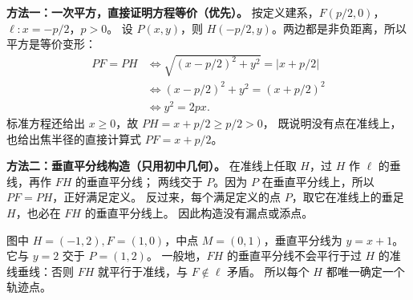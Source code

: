 \begin{proofbox}
\textbf{方法一：一次平方，直接证明方程等价（优先）。}
按定义建系，$F(p/2,0)$，$\ell:x=-p/2$，$p>0$。
设 $P(x,y)$，则 $H(-p/2,y)$。两边都是非负距离，所以平方是等价变形：
\[
\begin{aligned}
PF=PH
&\iff \sqrt{(x-p/2)^2+y^2}=|x+p/2|\\
&\iff (x-p/2)^2+y^2=(x+p/2)^2\\
&\iff \boxed{y^2=2px}.
\end{aligned}
\]
标准方程还给出 $x\ge0$，故 $PH=x+p/2\ge p/2>0$，
既说明没有点在准线上，也给出焦半径的直接计算式 $PF=x+p/2$。

\textbf{方法二：垂直平分线构造（只用初中几何）。}
在准线上任取 $H$，过 $H$ 作 $\ell$ 的垂线，再作 $FH$ 的垂直平分线；
两线交于 $P$。因为 $P$ 在垂直平分线上，所以 $PF=PH$，正好满足定义。
反过来，每个满足定义的点 $P$，取它在准线上的垂足 $H$，也必在 $FH$ 的垂直平分线上。
因此构造没有漏点或添点。
\end{proofbox}
\clearpage
\begin{proofbox}

图中 $H=(-1,2),F=(1,0)$，中点 $M=(0,1)$，垂直平分线为 $y=x+1$。
它与 $y=2$ 交于 $P=(1,2)$。
一般地，$FH$ 的垂直平分线不会平行于过 $H$ 的准线垂线：否则 $FH$ 就平行于准线，与 $F\notin\ell$ 矛盾。
所以每个 $H$ 都唯一确定一个轨迹点。
\end{proofbox}

